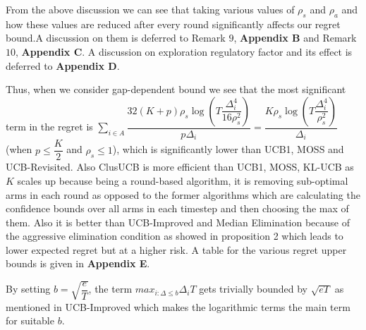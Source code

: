 \begin{remark}
From the above discussion we can see that taking various values of $\rho_{s}$ and $\rho_{a}$ and how these values are reduced after every round significantly affects our regret bound.A discussion on them is deferred to Remark $9$, \textbf{Appendix B} and Remark $10$, \textbf{Appendix C}. A discussion on exploration regulatory factor and its effect is deferred to \textbf{Appendix D}.
\end{remark}

\begin{remark}
	Thus, when we consider gap-dependent bound we see that the most significant term in the regret is $\sum_{i\in A}\dfrac{32(K+p)\rho_{s}\log{(T\dfrac{\Delta_{i}^{4}}{16\rho_{s}^{2}})}}{p\Delta_{i}}= \dfrac{K\rho_{s}\log{(T\dfrac{\Delta_{i}^{4}}{\rho_{s}^{2}})}}{\Delta_{i}}$ (when $p\leq \dfrac{K}{2}$ and $\rho_{s} \leq 1$), which is significantly lower than UCB1, MOSS and UCB-Revisited. Also ClusUCB is more efficient than UCB1, MOSS, KL-UCB as $K$ scales up because being a round-based algorithm, it is removing sub-optimal arms in each round as opposed to the former algorithms which are calculating the confidence bounds over all arms in each timestep and then choosing the max of them. Also it is better than UCB-Improved and Median Elimination because of the aggressive elimination condition as showed in proposition 2 which leads to lower expected regret but at a higher risk. A table for the various regret upper bounds is given in \textbf{Appendix E}. 
	
\end{remark}	

\begin{remark}
By setting $b=\sqrt{\dfrac{e}{T}}$, the term $max_{i:\Delta\leq b}\Delta_{i}T$ gets trivially bounded by $\sqrt{eT}$ as mentioned in UCB-Improved which makes the logarithmic terms the main term for suitable $b$. 
\end{remark}



